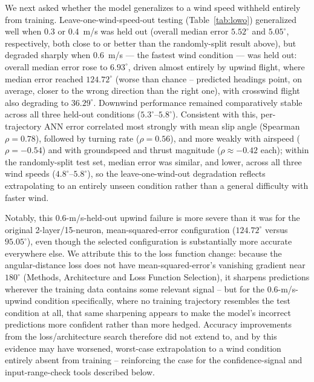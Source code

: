\documentclass[11pt]{article}
\begin{document}
We next asked whether the model generalizes to a wind speed withheld entirely from training. Leave-one-wind-speed-out testing (Table~\ref{tab:lowo}) generalized well when 0.3 or 0.4~m/s was held out (overall median error $5.52^\circ$ and $5.05^\circ$, respectively, both close to or better than the randomly-split result above), but degraded sharply when 0.6~m/s --- the fastest wind condition --- was held out: overall median error rose to $6.93^\circ$, driven almost entirely by upwind flight, where median error reached $124.72^\circ$ (worse than chance -- predicted headings point, on average, closer to the wrong direction than the right one), with crosswind flight also degrading to $36.29^\circ$. Downwind performance remained comparatively stable across all three held-out conditions ($5.3^\circ$--$5.8^\circ$). Consistent with this, per-trajectory ANN error correlated most strongly with mean slip angle (Spearman $\rho = 0.78$), followed by turning rate ($\rho = 0.56$), and more weakly with airspeed ($\rho = -0.54$) and with groundspeed and thrust magnitude ($\rho \approx -0.42$ each); within the randomly-split test set, median error was similar, and lower, across all three wind speeds ($4.8^\circ$--$5.8^\circ$), so the leave-one-wind-out degradation reflects extrapolating to an entirely unseen condition rather than a general difficulty with faster wind.

Notably, this 0.6-m/s-held-out upwind failure is more severe than it was for the original 2-layer/15-neuron, mean-squared-error configuration ($124.72^\circ$ versus $95.05^\circ$), even though the selected configuration is substantially more accurate everywhere else. We attribute this to the loss function change: because the angular-distance loss does not have mean-squared-error's vanishing gradient near $180^\circ$ (Methods, Architecture and Loss Function Selection), it sharpens predictions wherever the training data contains some relevant signal -- but for the 0.6-m/s-upwind condition specifically, where no training trajectory resembles the test condition at all, that same sharpening appears to make the model's incorrect predictions more confident rather than more hedged. Accuracy improvements from the loss/architecture search therefore did not extend to, and by this evidence may have worsened, worst-case extrapolation to a wind condition entirely absent from training -- reinforcing the case for the confidence-signal and input-range-check tools described below.
\end{document}
